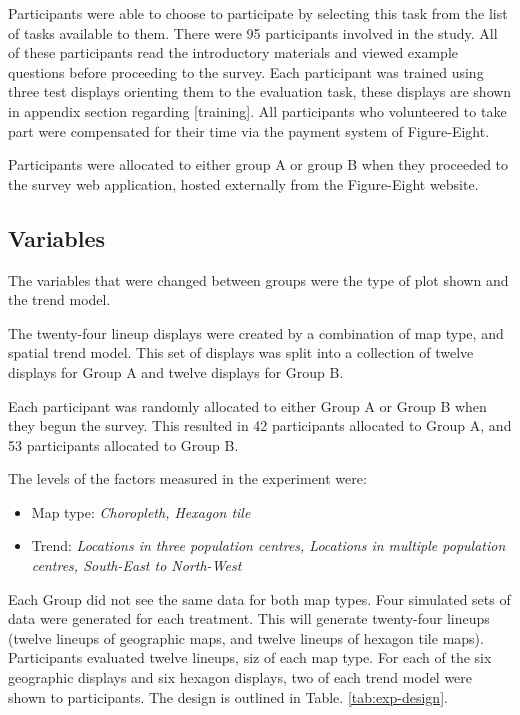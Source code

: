 \documentclass[conference,final,]{IEEEtran}
\providecommand{\tightlist}{%
  \setlength{\itemsep}{0pt}\setlength{\parskip}{0pt}}
\begin{document}
Participants were able to choose to participate by selecting this task from the list of tasks available to them.
There were 95 participants involved in the study. All of these participants read the introductory materials and viewed example questions before proceeding to the survey. Each participant was trained using three test displays orienting them to the evaluation task, these displays are shown in appendix section regarding {[}training{]}.
All participants who volunteered to take part were compensated for their time via the payment system of Figure-Eight.

Participants were allocated to either group A or group B when they proceeded to the survey web application, hosted externally from the Figure-Eight website.

\hypertarget{variables}{%
\subsection{Variables}\label{variables}}

The variables that were changed between groups were the type of plot shown and the trend model.

The twenty-four lineup displays were created by a combination of map type, and spatial trend model. This set of displays was split into a collection of twelve displays for Group A and twelve displays for Group B.

Each participant was randomly allocated to either Group A or Group B when they begun the survey. This resulted in 42 participants allocated to Group A, and 53 participants allocated to Group B.

The levels of the factors measured in the experiment were:

\begin{itemize}
\tightlist
\item
  Map type: \emph{Choropleth, Hexagon tile}
\item
  Trend: \emph{Locations in three population centres, Locations in multiple population centres, South-East to North-West}
\end{itemize}

Each Group did not see the same data for both map types. Four simulated sets of data were generated for each treatment.
This will generate twenty-four lineups (twelve lineups of geographic maps, and twelve lineups of hexagon tile maps). Participants evaluated twelve lineups, siz of each map type.
For each of the six geographic displays and six hexagon displays, two of each trend model were shown to participants. The design is outlined in Table. \ref{tab:exp-design}.
\end{document}
